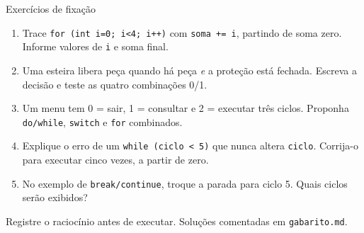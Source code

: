 \begin{frame}{Exercícios de fixação}
\begin{enumerate}
\item Trace \texttt{for (int i=0; i<4; i++)} com \texttt{soma += i}, partindo de soma zero. Informe valores de \texttt{i} e soma final.
\item Uma esteira libera peça quando há peça \emph{e} a proteção está fechada. Escreva a decisão e teste as quatro combinações 0/1.
\item Um menu tem 0 = sair, 1 = consultar e 2 = executar três ciclos. Proponha \texttt{do/while}, \texttt{switch} e \texttt{for} combinados.
\item Explique o erro de um \texttt{while (ciclo < 5)} que nunca altera \texttt{ciclo}. Corrija-o para executar cinco vezes, a partir de zero.
\item No exemplo de \texttt{break/continue}, troque a parada para ciclo 5. Quais ciclos serão exibidos?
\end{enumerate}
\small Registre o raciocínio antes de executar. Soluções comentadas em \texttt{gabarito.md}.
\end{frame}
